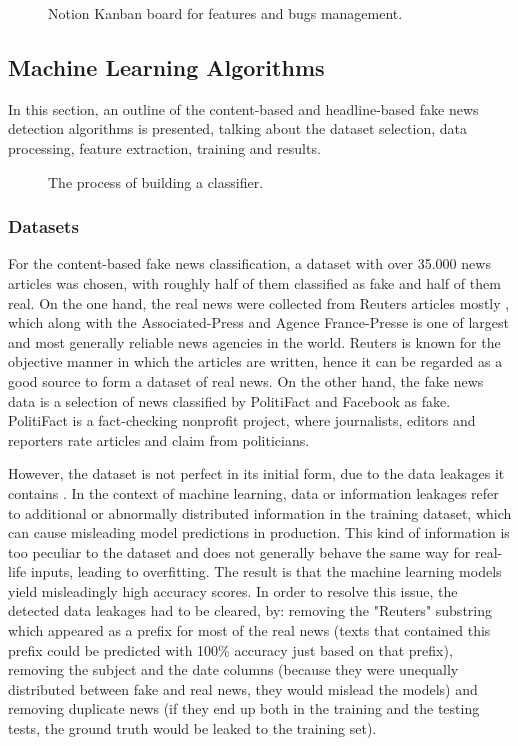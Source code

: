 \begin{figure}[h]
  \centering
  \caption{Notion Kanban board for features and bugs management.}
\end{figure}

\subsection{Machine Learning Algorithms}
In this section, an outline of the content-based and headline-based fake news detection algorithms is presented, talking about the dataset selection, data processing, feature extraction, training and results.

\begin{figure}[h]
  \centering
  \caption{The process of building a classifier.}
\end{figure}

\subsubsection{Datasets}
For the content-based fake news classification, a dataset \cite{dataset_content} with over 35.000 news articles was chosen, with roughly half of them classified as fake and half of them real. On the one hand, the real news were collected from Reuters articles mostly \cite{a1}, which along with the Associated-Press and Agence France-Presse is one of largest and most generally reliable news agencies in the world. Reuters is known for the objective manner in which the articles are written, hence it can be regarded as a good source to form a dataset of real news. On the other hand, the fake news data is a selection of news classified by PolitiFact and Facebook as fake. PolitiFact is a fact-checking nonprofit project, where journalists, editors and reporters rate articles and claim from politicians. 

However, the dataset is not perfect in its initial form, due to the data leakages it contains \cite{data_leaks}. In the context of machine learning, data or information leakages refer to additional or abnormally distributed information in the training dataset, which can cause misleading model predictions in production. This kind of information is too peculiar to the dataset and does not generally behave the same way for real-life inputs, leading to overfitting. The result is that the machine learning models yield misleadingly high accuracy scores. In order to resolve this issue, the detected data leakages had to be cleared, by: removing the "Reuters" substring which appeared as a prefix for most of the real news (texts that contained this prefix could be predicted with 100\% accuracy just based on that prefix), removing the subject and the date columns (because they were unequally distributed between fake and real news, they would mislead the models) and removing duplicate news (if they end up both in the training and the testing tests, the ground truth would be leaked to the training set).

